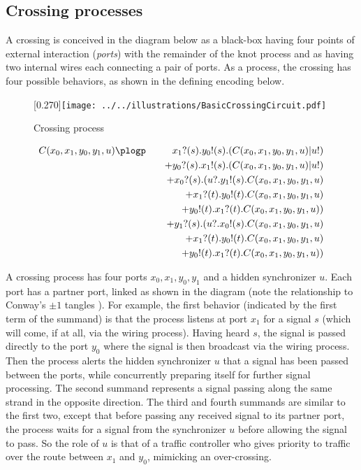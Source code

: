 \subsection{Crossing processes}\label{sub:crossing_processes} %
A crossing is conceived in the diagram below as a black-box having
four points of external interaction (\emph{ports}) with the remainder
of the knot process and as having two internal wires each connecting a
pair of ports. As a process, the crossing has four possible behaviors,
as shown in the defining encoding below.
\begin{figure}[hbp]
    \centering
    \scalebox{0.27}[0.270]{\texttt{[image: ../../illustrations/BasicCrossingCircuit.pdf]}}
    \caption{ Crossing process }
\end{figure}

\begin{eqnarray*}
   C(x_0,x_1,y_0,y_1,u) & \plogp   & x_1?(s).y_0!(s).(C(x_0,x_1,y_0,y_1,u)|u!) \nonumber \\
  & & + y_0?(s).x_1!(s).(C(x_0,x_1,y_0,y_1,u)|u!) \nonumber \\
  & & + x_0?(s).(u?.y_1!(s).C(x_0,x_1,y_0,y_1,u) \nonumber \\
  & & \ \ \ \ \ \ \ \ + x_1?(t).y_0!(t).C(x_0,x_1,y_0,y_1,u) \nonumber \\
  & & \ \ \ \ \ \ \ \ + y_0!(t).x_1?(t).C(x_0,x_1,y_0,y_1,u)) \nonumber \\
  & & + y_1?(s).(u?.x_0!(s).C(x_0,x_1,y_0,y_1,u) \nonumber \\
  & & \ \ \ \ \ \ \ \ + x_1?(t).y_0!(t).C(x_0,x_1,y_0,y_1,u) \nonumber \\
  & & \ \ \ \ \ \ \ \ + y_0!(t).x_1?(t).C(x_0,x_1,y_0,y_1,u)) \nonumber 
\end{eqnarray*}

A crossing process has four ports $x_0,x_1,y_0,y_1$ and a hidden
synchronizer $u$. Each port has a partner port, linked as shown in the
diagram (note the relationship to Conway's $\pm 1$ tangles
\cite{Conway1970An-enumeration-}). For example, the first behavior (indicated by the first
term of the summand) is that the process listens at port $x_1$ for a
signal $s$ (which will come, if at all, via the wiring
process). Having heard $s$, the signal is passed directly to the port
$y_0$ where the signal is then broadcast via the wiring process. Then
the process alerts the hidden synchronizer $u$ that a signal has been
passed between the ports, while concurrently preparing itself for
further signal processing. The second summand represents a signal
passing along the same strand in the opposite direction. The third and
fourth summands are similar to the first two, except that before
passing any received signal to its partner port, the process waits for
a signal from the synchronizer $u$ before allowing the signal to
pass. So the role of $u$ is that of a traffic controller who gives
priority to traffic over the route between $x_1$ and $y_0$, mimicking
an over-crossing.


